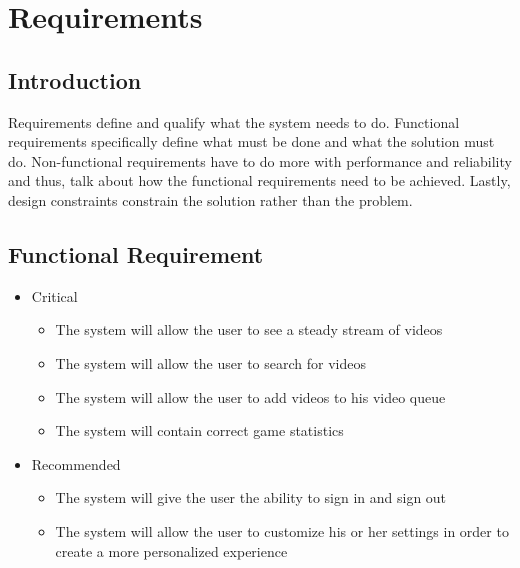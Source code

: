 \chapter{Requirements}

\section{Introduction}
	Requirements define and qualify what the system needs to do. Functional requirements specifically define what must be done and what the solution must do. Non-functional requirements have to do more with performance and reliability and thus, talk about how the functional requirements need to be achieved. Lastly, design constraints constrain the solution rather than the problem.
\section{Functional Requirement}
	\begin{itemize}
    \item Critical
    	\begin{itemize}
        \item The system will allow the user to see a steady stream of videos
        \item The system will allow the user to search for videos
        \item The system will allow the user to add videos to his video queue 
        \item The system will contain correct game statistics
    	\end{itemize}
   	\item Recommended
    	\begin{itemize}
		\item The system will give the user the ability to sign in and sign out 
        \item The system will allow the user to customize his or her settings in order to create a more personalized experience
    	\end{itemize} 
    \end{itemize}
